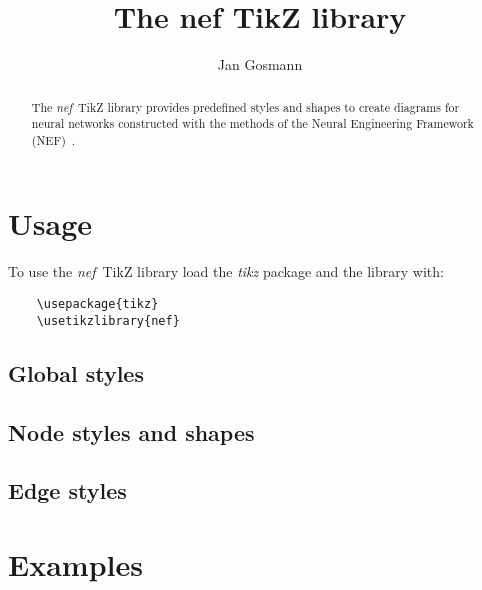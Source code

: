 \documentclass{ltxdoc}
\title{The \textbf{nef} TikZ library}
\author{Jan Gosmann}
\newcommand{\nef}{\emph{nef}}
\begin{document}
\maketitle
\begin{abstract}
    The \nef\ TikZ library provides predefined styles and shapes to create diagrams for neural networks constructed with the methods of the Neural Engineering Framework (NEF)~\cite{eliasmith2003}.
\end{abstract}
\tableofcontents

\section{Usage}

To use the \nef\ TikZ library load the \emph{tikz} package and the library with:
\begin{verbatim}
    \usepackage{tikz}
    \usetikzlibrary{nef}
\end{verbatim}

\subsection{Global styles}


\subsection{Node styles and shapes}

\subsection{Edge styles}


\section{Examples}


\printbibliography{}
\end{document}

